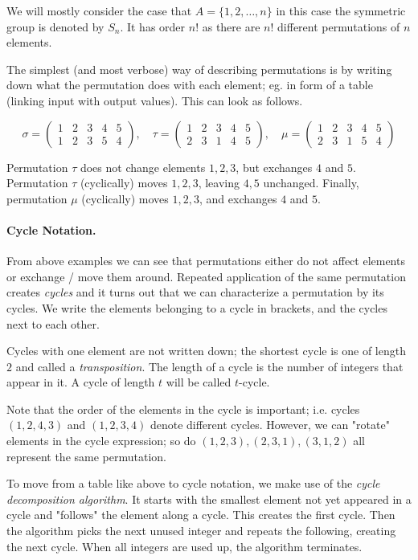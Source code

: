 We will mostly consider the case that $A = \{1, 2, \ldots, n\}$ in this case the symmetric group is denoted by $S_n$. It has order $n!$ as there are $n!$ different permutations of $n$ elements.

The simplest (and most verbose) way of describing permutations is by writing down what the permutation does with each element; eg. in form of a table (linking input with output values). This can look as follows.

\[
\sigma =
\begin{pmatrix}
1 & 2 & 3 & 4 & 5 \\
1 & 2 & 3 & 5 & 4
\end{pmatrix}
,\quad \tau = 
\begin{pmatrix}
1 & 2 & 3 & 4 & 5 \\
2 & 3 & 1 & 4 & 5
\end{pmatrix}
, \quad \mu = 
\begin{pmatrix}
1 & 2 & 3 & 4 & 5 \\
2 & 3 & 1 & 5 & 4
\end{pmatrix}
\]

Permutation $\tau$ does not change elements $1, 2, 3$, but exchanges $4$ and $5$. Permutation $\tau$ (cyclically) moves $1, 2, 3$, leaving $4, 5$ unchanged. Finally, permutation $\mu$ (cyclically) moves $1, 2, 3$, and exchanges $4$ and $5$.

\paragraph{Cycle Notation.} From above examples we can see that permutations either do not affect elements or exchange / move them around. Repeated application of the same permutation creates \emph{cycles} and it turns out that we can characterize a permutation by its cycles. We write the elements belonging to a cycle in brackets, and the cycles next to each other.

Cycles with one element are not written down; the shortest cycle is one of length $2$ and called a \emph{transposition}. The length of a cycle is the number of integers that appear in it. A cycle of length $t$ will be called $t$-cycle.

Note that the order of the elements in the cycle is important; i.e. cycles $(1,2,4,3)$ and $(1,2,3,4)$ denote different cycles. However, we can "rotate" elements in the cycle expression; so do $(1,2,3), (2,3,1), (3,1,2)$ all represent the same permutation.

To move from a table like above to cycle notation, we make use of the \emph{cycle decomposition algorithm}. It starts with the smallest element not yet appeared in a cycle and "follows" the element along a cycle. This creates the first cycle. Then the algorithm picks the next unused integer and repeats the following, creating the next cycle. When all integers are used up, the algorithm terminates.

